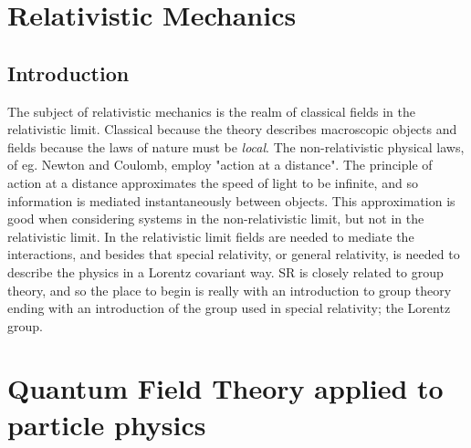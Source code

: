 \documentclass[a4paper,11pt,twoside]{book}
\theoremstyle{definition}
\begin{document}
	\part{Relativistic Mechanics}
	\chapter*{Introduction}
		The subject of relativistic mechanics is the realm of classical fields in the relativistic limit. Classical because the theory describes macroscopic objects and fields because the laws of nature must be \emph{local}. The non-relativistic physical laws, of eg. Newton and Coulomb, employ "action at a distance". The principle of action at a distance approximates the speed of light to be infinite, and so information is mediated instantaneously between objects. This approximation is good when considering systems in the non-relativistic limit, but not in the relativistic limit. In the relativistic limit fields are needed to mediate the interactions, and besides that special relativity, or general relativity, is needed to describe the physics in a Lorentz covariant way. SR is closely related to group theory, and so the place to begin is really with an introduction to group theory ending with an introduction of the group used in special relativity; the Lorentz group. 
	
	
	
	\part{Quantum Field Theory applied to particle physics}
	

	
	\begin{appendices}
		\appendixpage
		\noappendicestocpagenum
		\addappheadtotoc
	
		
		
		
	
	\end{appendices}
	
	
	
	
	
	\clearpage
	\printindex{}
\end{document}
